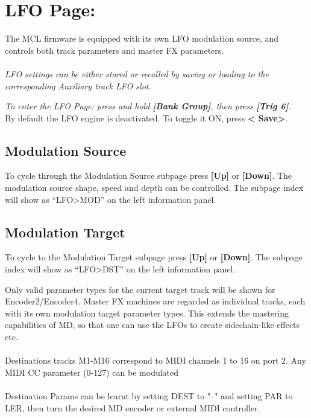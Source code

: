 \chapter{LFO Page:}
The MCL firmware is equipped with its own LFO modulation source, and controls both track parameters and master FX parameters.\\\\\textit{LFO settings can be either stored or recalled by saving or loading to the corresponding Auxiliary track LFO slot.}

\textit{To enter the LFO Page: press and hold \textbf{[Bank Group]}, then press \textbf{[Trig 6]}.}
\\
By default the LFO engine is deactivated. To toggle it ON, press \textbf{< Save>}.
\section{Modulation Source}

To cycle through the Modulation Source subpage press \textbf{[Up] }or \textbf{[Down]}. The modulation source shape, speed and depth can be controlled. The subpage index will show as ``LFO>MOD'' on the left information panel.


\newpage


\section{Modulation Target}
To cycle to the Modulation Target subpage press \textbf{[Up] }or \textbf{[Down]}. The subpage index will show as ``LFO>DST'' on the left information panel.


Only valid parameter types for the current target track will be shown for Encoder2/Encoder4. Master FX machines are regarded as individual tracks, each with its own modulation target parameter types. This extends the mastering capabilities of MD, so that one can use the LFOs to create sidechain-like effects etc.
\\\\
Destinations tracks M1-M16 correspond to MIDI channels 1 to 16 on port 2. Any MIDI CC parameter (0-127) can be modulated
\\\\
Destination Params can be learnt by setting DEST to "--" and setting PAR to LER, then turn the desired MD encoder or external MIDI controller.


